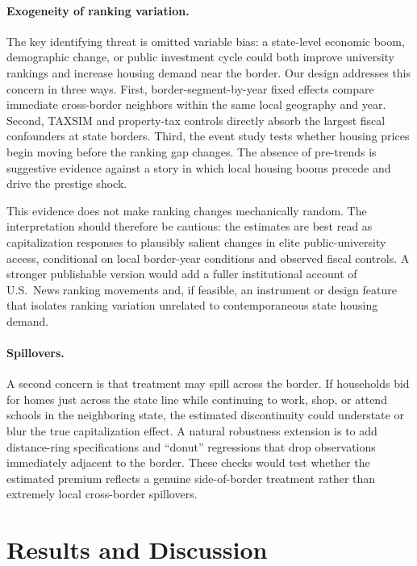 \documentclass[12pt]{article}
\begin{document}
\paragraph{Exogeneity of ranking variation.} The key identifying threat is omitted variable bias: a state-level economic boom, demographic change, or public investment cycle could both improve university rankings and increase housing demand near the border. Our design addresses this concern in three ways. First, border-segment-by-year fixed effects compare immediate cross-border neighbors within the same local geography and year. Second, TAXSIM and property-tax controls directly absorb the largest fiscal confounders at state borders. Third, the event study tests whether housing prices begin moving before the ranking gap changes. The absence of pre-trends is suggestive evidence against a story in which local housing booms precede and drive the prestige shock.

This evidence does not make ranking changes mechanically random. The interpretation should therefore be cautious: the estimates are best read as capitalization responses to plausibly salient changes in elite public-university access, conditional on local border-year conditions and observed fiscal controls. A stronger publishable version would add a fuller institutional account of U.S.\ News ranking movements and, if feasible, an instrument or design feature that isolates ranking variation unrelated to contemporaneous state housing demand.

\paragraph{Spillovers.} A second concern is that treatment may spill across the border. If households bid for homes just across the state line while continuing to work, shop, or attend schools in the neighboring state, the estimated discontinuity could understate or blur the true capitalization effect. A natural robustness extension is to add distance-ring specifications and ``donut'' regressions that drop observations immediately adjacent to the border. These checks would test whether the estimated premium reflects a genuine side-of-border treatment rather than extremely local cross-border spillovers.


\section{Results and Discussion}\label{sec:results}
\end{document}
